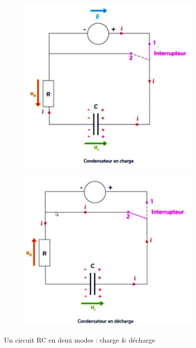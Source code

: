 \documentclass[11pt,a4paper]{article}
\begin{document}
\begin{figure}[H]
\centering
\begin{subfigure}{.47\textwidth}
  \centering
  \includegraphics[width=\linewidth]{imgs/p7/RCcharge.jpg}  
\end{subfigure}
\begin{subfigure}{.47\textwidth}
  \centering
  \includegraphics[width=.93\linewidth]{imgs/p7/RCdecharge.jpg}  
\end{subfigure}
\caption{Un circuit RC en deux modes : charge \& décharge}
\label{fig:decharge}
\end{figure}
\end{document}
